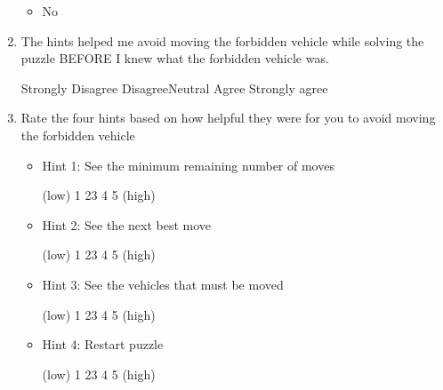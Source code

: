 \begin{enumerate}[topsep=-4em]
\begin{itemize}[topsep=-6em, label={o}]
\item No
\end{itemize}
\item The hints helped me avoid moving the forbidden vehicle while solving the puzzle BEFORE I knew what the forbidden vehicle was.
\par Strongly Disagree \hspace{1cm} Disagree\hspace{1cm}Neutral\hspace{1cm} Agree\hspace{1cm} Strongly agree
\item Rate the four hints based on how helpful they were for you to avoid moving the forbidden vehicle
\begin{itemize}[topsep=-6em, label={o}]
\itemsep-1em 
\item Hint 1: See the minimum remaining number of moves
\par (low) \hspace{0.5cm}1 \hspace{1cm} 2\hspace{1cm}3\hspace{1cm} 4\hspace{1cm} 5 \hspace{0.5cm} (high)
\item Hint 2: See the next best move 
\par (low) \hspace{0.5cm}1 \hspace{1cm} 2\hspace{1cm}3\hspace{1cm} 4\hspace{1cm} 5 \hspace{0.5cm} (high)
\item Hint 3: See the vehicles that must be moved
\par (low) \hspace{0.5cm}1 \hspace{1cm} 2\hspace{1cm}3\hspace{1cm} 4\hspace{1cm} 5 \hspace{0.5cm} (high)
\item Hint 4: Restart puzzle
\par (low) \hspace{0.5cm}1 \hspace{1cm} 2\hspace{1cm}3\hspace{1cm} 4\hspace{1cm} 5 \hspace{0.5cm} (high)
\end{itemize}

\end{enumerate}